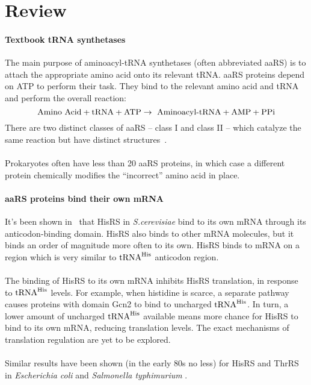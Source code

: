 \documentclass[12pt]{article}
\begin{document}
\maketitle

\section{Review}

\paragraph{Textbook tRNA synthetases}
The main purpose of aminoacyl-tRNA synthetases (often abbreviated aaRS) is to attach the appropriate amino acid onto its relevant tRNA. aaRS proteins depend on ATP to perform their task. They bind to the relevant amino acid and tRNA and perform the overall reaction:
%
\begin{equation}
\textnormal{Amino Acid} + \textnormal{tRNA} + \textnormal{ATP} \to \,\,\textnormal{Aminoacyl-tRNA} + \textnormal{AMP} + \textnormal{PPi}
\end{equation}
%
There are two distinct classes of aaRS -- class I and class II -- which catalyze the same reaction but have distinct structures~\cite{ibba2000aminoacyl}.\\
\\
Prokaryotes often have less than 20 aaRS proteins, in which case a different protein chemically modifies the ``incorrect'' amino acid in place.~\cite{molecular_biology_of_the_cell_5th}

\paragraph{aaRS proteins bind their own mRNA}
It's been shown in~\cite{levi2019mrna} that HisRS in \textit{S.cerevisiae} bind to its own mRNA through its anticodon-binding domain. HisRS also binds to other mRNA molecules, but it binds an order of magnitude more often to its own. HisRS binds to mRNA on a region which is very similar to $\textnormal{tRNA}^{\textnormal{His}}$ anticodon region.\\
\\
The binding of HisRS to its own mRNA inhibits HisRS translation, in response to $\textnormal{tRNA}^{\textnormal{His}}$ levels. For example, when histidine is scarce, a separate pathway causes proteins with domain Gcn2 to bind to uncharged $\textnormal{tRNA}^{\textnormal{His}}$. In turn, a lower amount of uncharged $\textnormal{tRNA}^{\textnormal{His}}$ available means more chance for HisRS to bind to its own mRNA, reducing translation levels. The exact mechanisms of translation regulation are yet to be explored.\\
\\
Similar results have been shown (in the early 80s no less) for HisRS and ThrRS in \textit{Escherichia coli} and \textit{Salmonella typhimurium} \cite{ames1983leader}\cite{graffe1992specificity}\cite{romby1996expression}.
\end{document}
